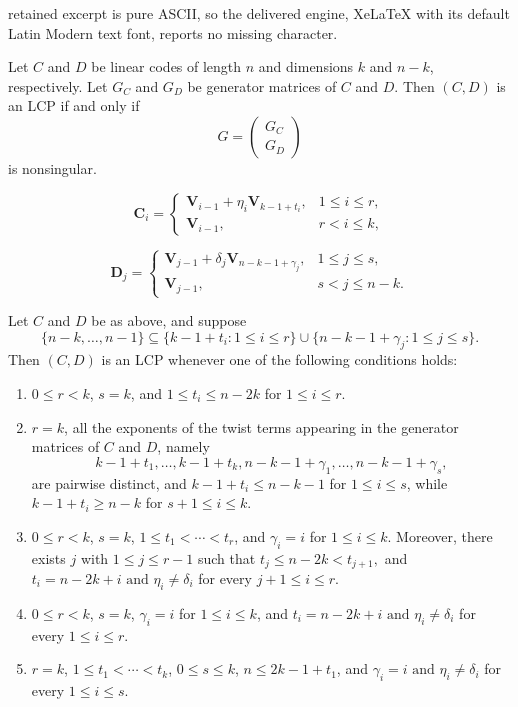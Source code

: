 \documentclass[10pt,a4paper]{amsart}
\begin{document}
retained excerpt is pure ASCII, so the delivered engine, XeLaTeX with its default Latin Modern text font, reports no missing character.
\begin{lemma}\label{eq:10821}
Let $C$ and $D$ be linear codes of length $n$ and dimensions $k$ and $n-k$, respectively. Let $G_C$ and $G_D$ be generator matrices of $C$ and $D$. Then $(C,D)$ is an LCP if and only if
\[
G=
\begin{pmatrix}
G_C\\
G_D
\end{pmatrix}
\]
is nonsingular.
\end{lemma}

\begin{equation}\label{eq:0821}
\mathbf{C}_i=
\begin{cases}
\mathbf{V}_{i-1}+\eta_i\mathbf{V}_{k-1+t_i},&1\le i\le r,\\
\mathbf{V}_{i-1},&r<i\le k,
\end{cases}
\end{equation}

\begin{equation}\label{eq:082101}
\mathbf{D}_j=
\begin{cases}
\mathbf{V}_{j-1}+\delta_j\mathbf{V}_{n-k-1+\gamma_j},&1\le j\le s,\\
\mathbf{V}_{j-1},&s<j\le n-k.
\end{cases}
\end{equation}

\begin{theorem}\label{thm:01}
Let \(C\) and \(D\) be as above, and suppose
\[
\{n-k,\ldots,n-1\}
\subseteq
\{k-1+t_i:1\le i\le r\}
\cup
\{n-k-1+\gamma_j:1\le j\le s\}.
\]
Then \((C,D)\) is an LCP whenever one of the following conditions holds:

\begin{enumerate}
\renewcommand{\labelenumi}{(\roman{enumi})}

\item
\(0\le r<k\), \(s=k\), and
\(1\le t_i\le n-2k\) for \(1\le i\le r\).

\item
\(r=k\), all the exponents of the twist terms appearing in the
generator matrices of \(C\) and \(D\), namely
\[
k-1+t_1,\ldots,k-1+t_k, n-k-1+\gamma_1,\ldots,n-k-1+\gamma_s,
\]
are pairwise distinct, and
\(k-1+t_i\le n-k-1\) for \(1\le i\le s\), while
\(k-1+t_i\ge n-k\) for \(s+1\le i\le k\).

\item
\(0\le r<k\), \(s=k\),
\(1\le t_1<\cdots<t_r\), and
\(\gamma_i=i\) for \(1\le i\le k\).
Moreover, there exists \(j\) with \(1\le j\le r-1\) such that
\(
t_j\le n-2k<t_{j+1},
\)
and
$t_i=n-2k+i\text{ and }\eta_i\ne\delta_i$
for every \(j+1\le i\le r\).
\item
\(0\le r<k\), \(s=k\),
\(\gamma_i=i\) for \(1\le i\le k\), and $t_i=n-2k+i\text{ and }
\eta_i\ne\delta_i$ for every \(1\le i\le r\).

\item
\(r=k\), \(1\le t_1<\cdots<t_k\),
\(0\le s\le k\), \(n\le 2k-1+t_1\), and $\gamma_i=i\text{ and }
\eta_i\ne\delta_i$ for every \(1\le i\le s\).
\end{enumerate}
\end{theorem}
\end{document}
